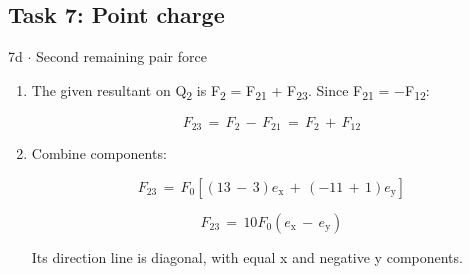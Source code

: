 \documentclass[11pt]{article}
\begin{document}
\begin{keepsection}\subsection{Task 7: Point charge}

\begin{workedbox}{7d \ensuremath{\cdot} Second remaining pair force}
\begin{enumerate}
\item {}
The given resultant on Q\textsubscript{2} is F\textsubscript{2} = F\textsubscript{21} + F\textsubscript{23}. Since F\textsubscript{21} = \ensuremath{-}F\textsubscript{12}:

\begin{equation*}{F}_{23}\, =\, {F}_{2}\, -\, {F}_{21}\, =\, {F}_{2}\, +\, {F}_{12}\end{equation*}
\item {}
Combine components:

\begin{equation*}{F}_{23}\, =\, {F}_{0}[(13\, -\, 3){e}_{\mathrm{x}}\, +\, (-11\, +\, 1){e}_{\mathrm{y}}]\end{equation*}

\begin{equation*}{F}_{23}\, =\, 10{F}_{0}({e}_{\mathrm{x}}\, -\, {e}_{\mathrm{y}})\end{equation*}

Its direction line is diagonal, with equal x and negative y components.
\end{enumerate}
\end{workedbox}

\end{keepsection}
\end{document}
